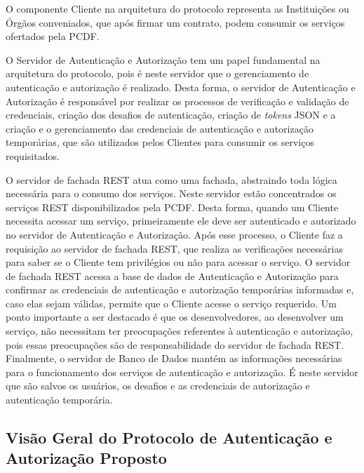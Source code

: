 O componente Cliente na arquitetura do protocolo representa as Instituições ou Órgãos conveniados, que após firmar um contrato, podem consumir os serviços ofertados pela PCDF.

O Servidor de Autenticação e Autorização tem um papel fundamental na arquitetura do protocolo, pois é neste servidor que o gerenciamento de autenticação e autorização é realizado. Desta forma, o servidor de Autenticação e Autorização é responsável por realizar os processos de verificação e validação de credenciais, criação dos desafios de autenticação, criação de \emph{tokens} JSON e a criação e o gerenciamento das credenciais de autenticação e autorização temporárias, que são utilizados pelos Clientes para consumir os serviços requisitados.

O servidor de fachada REST atua como uma fachada, abstraindo toda lógica necessária para o consumo dos serviços. Neste servidor estão concentrados os serviços REST disponibilizados pela PCDF. Desta forma, quando um Cliente necessita acessar um serviço, primeiramente ele deve ser autenticado e autorizado no servidor de Autenticação e Autorização. Após esse processo, o Cliente faz a requisição ao servidor de fachada REST, que realiza as verificações necessárias para saber se o Cliente tem privilégios ou não para acessar o serviço. O servidor de fachada REST acessa a base de dados de Autenticação e Autorização para confirmar as credenciais de autenticação e autorização temporárias informadas e, caso elas sejam válidas, permite que o Cliente acesse o serviço requerido. Um ponto importante a ser destacado é que os desenvolvedores, ao desenvolver um serviço, não necessitam ter preocupações referentes à autenticação e autorização, pois essas preocupações são de responsabilidade do servidor de fachada REST. Finalmente, o servidor de Banco de Dados mantém as informações necessárias para o funcionamento dos serviços de autenticação e autorização. É neste servidor que são salvos os usuários, os desafios e as credenciais de autorização e autenticação temporária.


\subsection{Visão Geral do Protocolo de Autenticação e Autorização Proposto}

